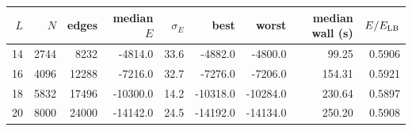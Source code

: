 \begin{tabular}{rrrrrrrrr}
\toprule
$L$ & $N$ & edges & median $E$ & $\sigma_E$ & best & worst & median wall (s) & $E/E_{\rm LB}$ \\
\midrule
14 & 2744 & 8232 & -4814.0 & 33.6 & -4882.0 & -4800.0 & 99.25 & 0.5906 \\
16 & 4096 & 12288 & -7216.0 & 32.7 & -7276.0 & -7206.0 & 154.31 & 0.5921 \\
18 & 5832 & 17496 & -10300.0 & 14.2 & -10318.0 & -10284.0 & 230.64 & 0.5897 \\
20 & 8000 & 24000 & -14142.0 & 24.5 & -14192.0 & -14134.0 & 250.20 & 0.5908 \\
\bottomrule
\end{tabular}
